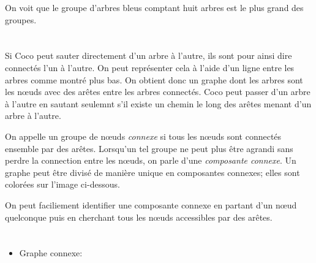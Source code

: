 {{{\centering%
\par}

On voit que le groupe d’arbres bleus comptant huit arbres est le plus grand des groupes.



\section*{\BrochureItsInformatics}
Si Coco peut sauter directement d’un arbre à l’autre, ils sont pour ainsi dire connectés l’un à l’autre. On peut représenter cela à l’aide d’un ligne entre les arbres comme montré plus bas. On obtient donc un graphe dont les arbres sont les nœuds avec des arêtes entre les arbres connectés. Coco peut passer d’un arbre à l’autre en sautant seulemnt s’il existe un chemin le long des arêtes menant d’un arbre à l’autre.

On appelle un groupe de nœuds \emph{connexe} si tous les nœuds sont connectés ensemble par des arêtes. Lorsqu’un tel groupe ne peut plus être agrandi sans perdre la connection entre les nœuds, on parle d’une \emph{composante connexe}. Un graphe peut être divisé de manière unique en composantes connexes; elles sont colorées sur l’image ci-dessous.

{\centering%
\par}

On peut faciliement identifier une composante connexe en partant d’un nœud quelconque puis en cherchant tous les nœuds accessibles par des arêtes.



\section*{\BrochureWebsitesAndKeywords}
{\raggedright
\begin{itemize}
  \item Graphe connexe: \href{https://fr.wikipedia.org/wiki/Graphe_connexe}{}
\end{itemize}


}

}{}

}
